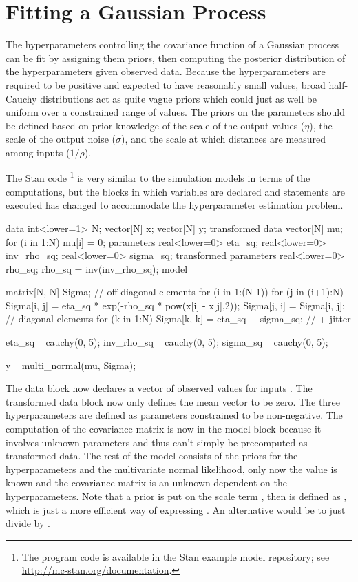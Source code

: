 \section{Fitting a Gaussian Process}\label{fit-gp.section}

The hyperparameters controlling the covariance function of a Gaussian
process can be fit by assigning them priors, then computing the
posterior distribution of the hyperparameters given observed data.
Because the hyperparameters are required to be positive and expected
to have reasonably small values, broad half-Cauchy distributions act
as quite vague priors which could just as well be uniform over a
constrained range of values.  The priors on the parameters should be
defined based on prior knowledge of the scale of the output values
($\eta$), the scale of the output noise ($\sigma$), and the scale at
which distances are measured among inputs ($1/\rho$).

The Stan code%
%
\footnote{The program code is available in the Stan example model repository;
see \url{http://mc-stan.org/documentation}.}
%
is very similar to the simulation models in terms of the
computations, but the blocks in which variables are declared and
statements are executed has changed to accommodate the hyperparameter
estimation problem.
%
\begin{stancode}
data {
  int<lower=1> N;
  vector[N] x;
  vector[N] y;
}
transformed data {
  vector[N] mu;
  for (i in 1:N) mu[i] = 0;
}
parameters {
  real<lower=0> eta_sq;
  real<lower=0> inv_rho_sq;
  real<lower=0> sigma_sq;
}
transformed parameters {
  real<lower=0> rho_sq;
  rho_sq = inv(inv_rho_sq);
}
model {
  matrix[N, N] Sigma;
  // off-diagonal elements
  for (i in 1:(N-1)) {
    for (j in (i+1):N) {
      Sigma[i, j] = eta_sq * exp(-rho_sq * pow(x[i] - x[j],2));
      Sigma[j, i] = Sigma[i, j];
    }
  }
  // diagonal elements
  for (k in 1:N)
    Sigma[k, k] = eta_sq + sigma_sq;  // + jitter

  eta_sq ~ cauchy(0, 5);
  inv_rho_sq ~ cauchy(0, 5);
  sigma_sq ~ cauchy(0, 5);

  y ~ multi_normal(mu, Sigma);
}
\end{stancode}
%
The data block now declares a vector  of observed values
 for inputs .  The transformed data block now
only defines the mean vector to be zero.  The three hyperparameters
are defined as parameters constrained to be non-negative.  The
computation of the covariance matrix  is now in the model
block because it involves unknown parameters and thus can't simply be
precomputed as transformed data.  The rest of the model consists of
the priors for the hyperparameters and the multivariate
normal likelihood, only now the value  is known and the
covariance matrix  is an unknown dependent on the
hyperparameters.  Note that a prior is put on the scale term
, then  is defined as
, which is just a more efficient way of
expressing .  An alternative would be to just divide
by .

